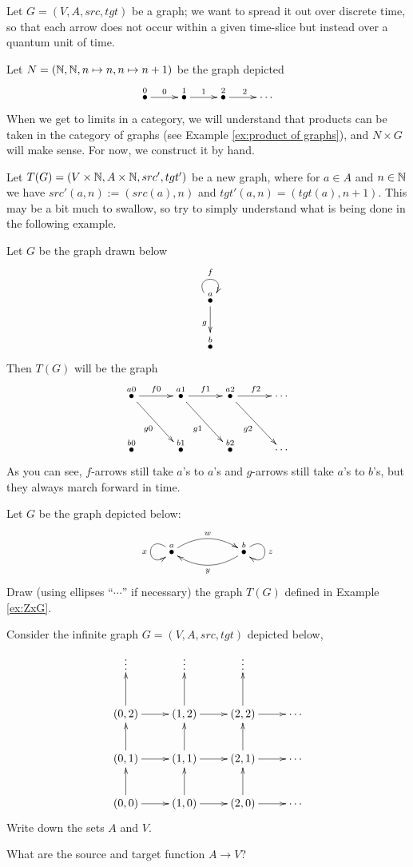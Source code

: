 \documentclass[CT4S-EN-RU]{subfiles}
\begin{document}
\begin{exampleENG}\label{ex:ZxG}
Let $G=(V,A,src,tgt)$ be a graph; we want to spread it out over discrete time, so that each arrow does not occur within a given time-slice but instead over a quantum unit of time. 

Let $N=({\mathbb N},{\mathbb N},n\mapsto n,n\mapsto n+1)$ be the graph depicted 
$$\xymatrix{\LMO{0}\ar[r]^0&\LMO{1}\ar[r]^1&\LMO{2}\ar[r]^2&\cdots}$$
When we get to limits in a category, we will understand that products can be taken in the category of graphs (see  Example \ref{ex:product of graphs}), and $N\times G$ will make sense. For now, we construct it by hand.

Let $T(G)=(V\times {\mathbb N},A\times{\mathbb N},src',tgt')$ be a new graph, where for $a\in A$ and $n\in{\mathbb N}$ we have $src'(a,n):=(src(a),n)$ and $tgt'(a,n)=(tgt(a),n+1)$. This may be a bit much to swallow, so try to simply understand what is being done in the following example. 

Let $G$ be the graph drawn below 
$$\xymatrix{\LMO{a}\ar@(ul,ur)[]^f\ar[d]_g\\\LMO{b}}$$
Then $T(G)$ will be the graph 
$$\xymatrix@=30pt{
\LMO{a0}\ar[r]^{f0}\ar[rd]_{g0}&\LMO{a1}\ar[r]^{f1}\ar[rd]_{g1}&\LMO{a2}\ar[r]^{f2}\ar[rd]_{g2}&\cdots\\
\LMO{b0}&\LMO{b1}&\LMO{b2}&\cdots
}
$$
As you can see, $f$-arrows still take $a$'s to $a$'s and $g$-arrows still take $a$'s to $b$'s, but they always march forward in time.
\end{exampleENG}

\begin{exampleRUS}\label{ex:ZxG}
\end{exampleRUS}

\begin{exerciseENG}\label{exc:secret turing}
Let $G$ be the graph depicted below:
$$
\xymatrix{\LMO{a}\ar@/^1pc/[rr]^w\ar@(lu,ld)[]_x&&\LMO{b}\ar@/^1pc/[ll]^y\ar@(ur,dr)[]^z}
$$
Draw (using ellipses “$\cdots$” if necessary) the graph $T(G)$ defined in Example \ref{ex:ZxG}.
\end{exerciseENG}

\begin{exerciseRUS}\label{exc:secret turing}
\end{exerciseRUS}

\begin{exerciseENG}\label{exc:lattice}
Consider the infinite graph $G=(V,A,src,tgt)$ depicted below,
$$
\xymatrix{
\vdots&\vdots&\vdots\\
(0,2)\ar[r]\ar[u]&(1,2)\ar[r]\ar[u]&(2,2)\ar[r]\ar[u]&\cdots\\
(0,1)\ar[r]\ar[u]&(1,1)\ar[r]\ar[u]&(2,1)\ar[r]\ar[u]&\cdots\\
(0,0)\ar[r]\ar[u]&(1,0)\ar[r]\ar[u]&(2,0)\ar[r]\ar[u]&\cdots}
$$
\sexc Write down the sets $A$ and $V$. 
\item What are the source and target function $A\to V$?  
\endsexc
\end{exerciseENG}
\end{document}
